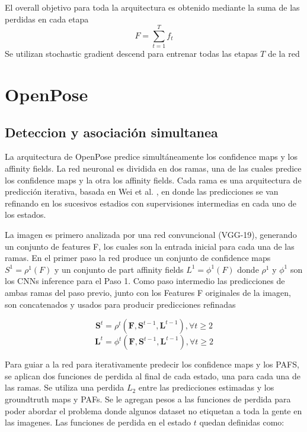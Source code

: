 \documentclass[runningheads]{llncs}
\begin{document}
El overall objetivo para toda la arquitectura es obtenido mediante la suma de las perdidas en cada etapa
\begin{equation}
\textit{F} = \sum_{t=1}^{\textit{T}}f_t
\end{equation}
Se utilizan stochastic gradient descend para entrenar todas las etapas $\textit{T}$ de la red


\section{OpenPose}

\subsection{Deteccion y asociación simultanea}
La arquitectura de OpenPose predice simultáneamente los confidence maps y los affinity fields. La red neuronal es dividida en dos ramas, una de las cuales predice los confidence maps y la otra los affinity fields. Cada rama es una arquitectura de predicción iterativa, basada en Wei et al. \cite{convposemachine}, en donde las predicciones se van refinando en los sucesivos estadios con supervisiones intermedias en cada uno de los estados.

La imagen es primero analizada por una red convuncional (VGG-19), generando un conjunto de features F, los cuales son la entrada inicial para cada una de las ramas. En el primer paso la red produce un conjunto de confidence maps $ S^{1} = \rho^{1}(F) $ y un conjunto de part affinity fields $ L^{1} = \phi^{1}(F) $ donde $ \rho^{1} $ y $ \phi^{1} $ son los CNNs inference para el Paso 1. Como paso intermedio las predicciones de ambas ramas del paso previo, junto con los Features F originales de la imagen, son concatenados y usados para producir predicciones refinadas

\begin{equation}
\textbf{S}^t = \rho^t(\textbf{F},\textbf{S}^{t-1},\textbf{L}^{t-1}), \forall t \geq 2
\end{equation}
\begin{equation}
\textbf{L}^t = \phi^t(\textbf{F},\textbf{S}^{t-1},\textbf{L}^{t-1}), \forall t \geq 2
\end{equation}

Para guiar a la red para iterativamente predecir los confidence maps y los PAFS, se aplican dos funciones de perdida al final de cada estado, una para cada una de las ramas. Se utiliza una perdida $L_{2}$ entre las predicciones estimadas y los groundtruth maps y PAFs. Se le agregan pesos a las funciones de perdida para poder abordar el problema donde algunos dataset no etiquetan a toda la gente en las imagenes. Las funciones de perdida en el estado $t$ quedan definidas como:
\end{document}
